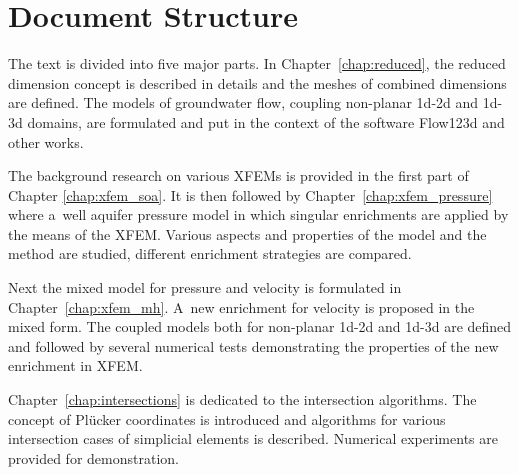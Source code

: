 




\section{Document Structure} \label{sec:structure}

The text is divided into five major parts.
In Chapter~\ref{chap:reduced}, the reduced dimension concept is described in details and the meshes of combined dimensions are defined.
The models of groundwater flow, coupling non-planar 1d-2d and 1d-3d domains, are formulated and put in the context of the software Flow123d 
and other works.


The background research on various XFEMs is provided in the first part of Chapter \ref{chap:xfem_soa}.
It is then followed by Chapter~\ref{chap:xfem_pressure} where a~well aquifer pressure model
in which singular enrichments are applied by the means of the XFEM.
Various aspects and properties of the model and the method are studied, different enrichment strategies are compared. 


Next the mixed model for pressure and velocity is formulated in Chapter~\ref{chap:xfem_mh}.
A~new enrichment for velocity is proposed in the mixed form.
The coupled models both for non-planar 1d-2d and 1d-3d are defined and followed by several
numerical tests demonstrating the properties of the new enrichment in XFEM.

Chapter~\ref{chap:intersections} is dedicated to the intersection algorithms.
The concept of Pl\"ucker coordinates is introduced and algorithms for various intersection cases
of simplicial elements is described. Numerical experiments are provided for demonstration.


